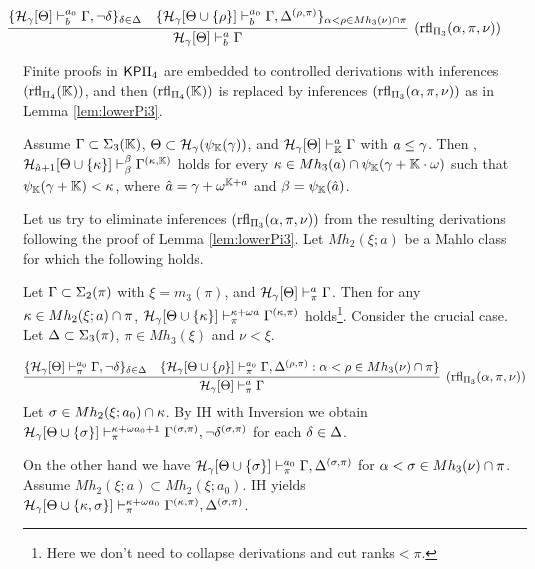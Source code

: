 \documentclass{article}
\newcommand{\mK}{\mathbb{K}}
\begin{document}
{\small
\[
\hspace{-10mm}
\infer[({\rm rfl}_{\Pi_{3}}(\alp,\pi,\nu))]{
\calh_{\gam}[\Tht]\vdash^{a}_{b}\Gam}
{
\{
\mathcal{H}_{\gam}[\Tht]\vdash^{a_{0}}_{b}\Gamma, \lnot\del
\}_{\del\in\Del}
&
\{
\mathcal{H}_{\gam}[\Tht\cup \{\rho\}]\vdash^{a_{0}}_{b}\Gamma, 
\Del^{(\rho,\pi)}\}_{\alp<\rho\in Mh_{3}(\nu)\cap \pi}
}
\]
}

\edes

Finite proofs in ${\sf KP}\Pi_{4}$ are embedded to controlled derivations with 
inferences $({\rm rfl}_{\Pi_{4}}(\mK))$, and then $({\rm rfl}_{\Pi_{4}}(\mK))$ is replaced by
inferences $({\rm rfl}_{\Pi_{3}}(\alpha,\pi,\nu))$ as in Lemma \ref{lem:lowerPi3}.


\blem\label{lem:lowerPi4}
Assume $\Gam\subset\Sig_{3}(\mK)$, $\Tht\subset\calh_{\gam}(\psi_{\mK}(\gam))$,
and
$\calh_{\gam}[\Tht]\vdash^{a}_{\mK}\Gam$ with $a\leq\gamma$.
Then ,
$\calh_{\hat{a}+1}[\Tht\cup \{\kap\}]\vdash^{\bet}_{\bet}\Gam^{(\kap,\mK)}$ holds for every
$\kap\in Mh_{3}(a)\cap \psi_{\mK}(\gam+\mK\cdot\ome)$ such that $\psi_{\mK}(\gam+\mK)<\kap$,
where $\hat{a}=\gam+\ome^{\mK+a}$ and $\bet=\psi_{\mK}(\hat{a})$.
\elem



Let us try to eliminate inferences $({\rm rfl}_{\Pi_{3}}(\alpha,\pi,\nu))$ from the resulting derivations
following the proof of Lemma \ref{lem:lowerPi3}.
Let $Mh_{2}(\xi;a)$ be a Mahlo class for which the following holds.



\blem\label{lem:lowerPi43}
Let $\Gamma\subset\Sigma_{2}(\pi)$ with $\xi=m_{3}(\pi)$, 
 and
${\cal H}_{\gamma}[\Theta]\vdash^{a}_{\pi}\Gamma$.
Then for any $\kappa\in Mh_{2}(\xi;a)\cap \pi$,
${\cal H}_{\gamma}[\Theta\cup\{\kappa\}]\vdash^{\kappa+\omega a}_{\pi}\Gamma^{(\kappa,\pi)}$ holds\footnote{Here we don't need to collapse derivations and cut ranks$<\pi$.}.
\elem
Consider the crucial case.
Let $\Delta\subset\Sigma_{3}(\pi)$, $\pi\in Mh_{3}(\xi)$ and $\nu<\xi$.


\[
\infer[({\rm rfl}_{\Pi_{3}}(\alp,\pi,\nu))]{
\calh_{\gam}[\Tht]\vdash^{a}_{\pi}\Gam}
{
\{
\mathcal{H}_{\gam}[\Tht]\vdash^{a_{0}}_{\pi}\Gamma, \lnot\del
\}_{\del\in\Del}
&
\{
\mathcal{H}_{\gam}[\Tht\cup\{\rho\}]\vdash^{a_{0}}_{\pi}\Gamma, 
\Del^{(\rho,\pi)}: \alp<\rho\in Mh_{3}(\nu)\cap \pi\}
}
\]
Let $\sigma\in Mh_{2}(\xi;a_{0})\cap \kappa$.
By IH with Inversion we obtain
$\mathcal{H}_{\gamma}[\Theta\cup\{\sigma\}]\vdash^{\kappa+\omega a_{0}+1}_{\pi}\Gamma^{(\sigma,\pi)}, \lnot \delta^{(\sigma,\pi)}$
for each $\delta\in\Delta$.

On the other hand we have
$\mathcal{H}_{\gamma}[\Theta\cup\{\sigma\}]\vdash^{a_{0}}_{\pi}\Gamma, 
\Delta^{(\sigma,\pi)}$
for $\alpha<\sigma\in Mh_{3}(\nu)\cap \pi$.
Assume 
$Mh_{2}(\xi;a)\subset Mh_{2}(\xi;a_{0})$.
IH yields
$\mathcal{H}_{\gamma}[\Theta\cup\{\kappa,\sigma\}]\vdash^{\kappa+\omega a_{0}}_{\pi}\Gamma^{(\kappa,\pi)}, 
\Delta^{(\sigma,\pi)}$.
\end{document}
